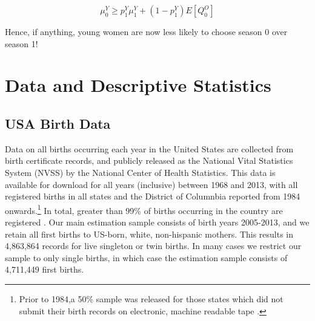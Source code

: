 \documentclass[a4paper, 11 pt]{article}
\theoremstyle{plain}
\begin{document}
\begin{spacing}{1.2}
\begin{equation}\label{A15}
     \mu_0^{Y}  \geq  p_1^{Y} \mu_1^{Y} + (1-p_1^{Y})E[Q_0^{O}]
\end{equation}

Hence, if anything, young women are now less likely to choose season 0 over season 1!


\section{Data and Descriptive Statistics}
\subsection{USA Birth Data}
\label{bqSscn:USAdata}
Data on all births occurring each year in the United States are collected from 
birth certificate records, and publicly released as the National Vital 
Statistics System (NVSS) by the National Center of Health Statistics. This data 
is available for download for all years (inclusive) between 1968 and 2013, with
all registered births in all states and the District of Columnbia 
reported from 1984 onwards.\footnote{Prior to 1984,a 50\% sample was released 
for those states which did not submit their birth records on electronic, 
machine readable tape \citep{Martinetal2015}.}  In total, greater than 99\% 
of births occurring in the country are registered \citep{Martinetal2015}.
Our main estimation sample consists of birth years 2005-2013, and we retain 
all first births to US-born, white, non-hispanic mothers.  This results in
4,863,864 records for live singleton or twin births.  In many cases we 
restrict our sample to only single births, in which case the estimation sample 
consists of 4,711,449 first births.


\end{spacing}
\end{document}

